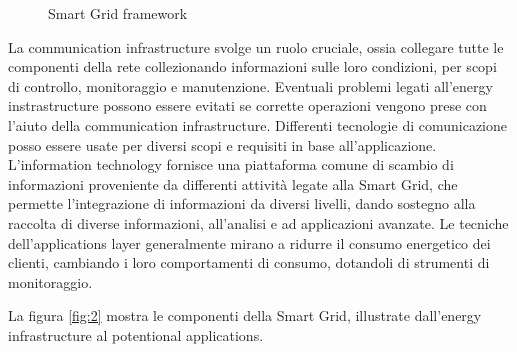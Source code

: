 \begin{figure}[h] 
\caption{Smart Grid framework}\label{fig:1}
\end{figure}

La communication infrastructure svolge un ruolo cruciale, ossia collegare tutte le componenti della rete collezionando informazioni sulle loro condizioni, per scopi di controllo, monitoraggio e manutenzione. Eventuali problemi legati all'energy instrastructure possono essere evitati se corrette operazioni vengono prese con l'aiuto della communication infrastructure. 
\newline 
Differenti tecnologie di comunicazione posso essere usate per diversi scopi e requisiti in base all'applicazione. L'information technology fornisce una piattaforma comune di scambio di informazioni proveniente da differenti attività legate alla Smart Grid, che permette l'integrazione di informazioni da diversi livelli, dando sostegno alla raccolta di diverse informazioni, all'analisi e ad applicazioni avanzate.
\newline
Le tecniche dell'applications layer generalmente mirano a ridurre il consumo energetico dei clienti, cambiando i loro comportamenti di consumo, dotandoli di strumenti di monitoraggio.    

\newpage
La figura \ref{fig:2} mostra le componenti della Smart Grid, illustrate dall'energy infrastructure al potentional applications.

